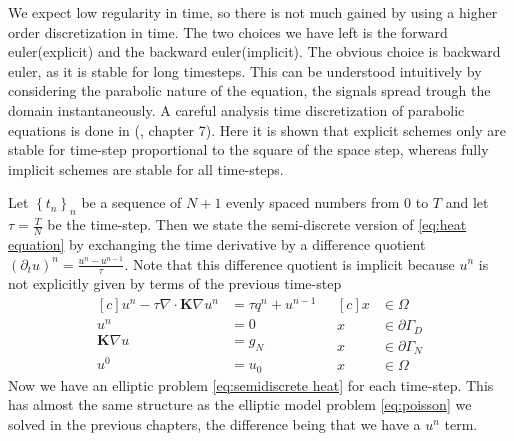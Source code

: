\documentclass[../Main/main.tex]{subfiles}
\begin{document}
	We expect low regularity in time, so there is not much gained by using a higher order discretization in time. The two choices we have left is the forward euler(explicit) and the backward euler(implicit). The obvious choice is backward euler, as it is stable for long timesteps. This can be understood intuitively by considering the parabolic nature of the equation, the signals spread trough the domain instantaneously. A careful analysis time discretization of parabolic equations is done in (\cite{Knabner}, chapter 7).  Here it is shown that explicit schemes only are stable for time-step proportional to the square of the space step, whereas fully implicit schemes are stable for all time-steps. \par  Let $\left \{ t_n \right \}_n$ be a sequence of $N+1$ evenly spaced numbers from $0$ to $T$ and let $\tau = \frac{T}{N}$ be the time-step. Then we state the semi-discrete version of \eqref{eq:heat equation} by exchanging the time derivative by a difference quotient $(\partial_t u)^n = \frac{u^n-u^{n-1}}{\tau}$. Note that this difference quotient is implicit because $u^n$ is not explicitly given by terms of the previous time-step
	\begin{equation}\label{eq:semidiscrete heat}
		\begin{aligned}[c]
			u^n - \tau \nabla \cdot \pmb{K} \nabla u^n &= \tau q^n+u^{n-1}\\
			u^n &= 0 \\
			\pmb{K}\nabla u &= g_N\\
			u^0 &= u_0
		\end{aligned}
		\ \ \
		\begin{aligned}[c]
			x &\in \Omega  \\
			x &\in \partial \Gamma_D \\
			x &\in \partial \Gamma_N \\
			x &\in \Omega  
		\end{aligned}
	\end{equation}
	Now we have an elliptic problem \eqref{eq:semidiscrete heat} for each time-step. This has almost the same structure as the elliptic model problem \eqref{eq:poisson} we solved in the previous chapters, the difference being that we have a $u^n$ term.
\end{document}
